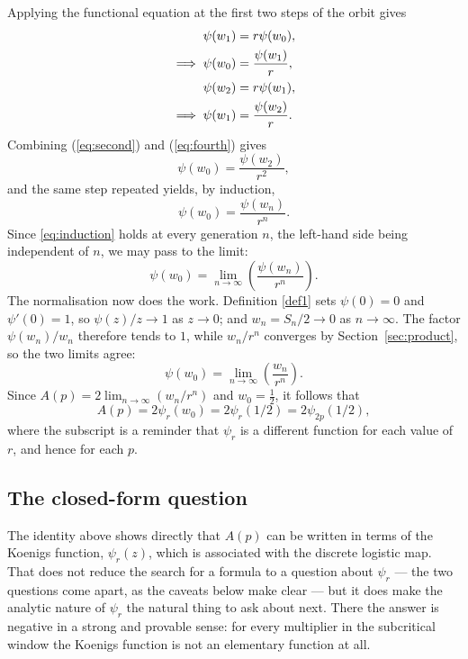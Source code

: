 \documentclass[11pt]{article}
\begin{document}
\vspace{10pt}
\noindent
Applying the functional equation at the first two steps of the orbit gives
\begin{align}
\psi(w_1) &= r\psi(w_0), \notag\\
\implies \psi(w_0) &= \frac{\psi(w_1)}{r}, \label{eq:second} \\
\psi(w_2) &= r\psi(w_1), \notag\\
\implies \psi(w_1) &= \frac{\psi(w_2)}{r}. \label{eq:fourth}
\end{align}
Combining (\ref{eq:second}) and (\ref{eq:fourth}) gives
$$\psi(w_0) = \frac{\psi(w_2)}{r^2},$$
and the same step repeated yields, by induction,
\begin{equation}
\psi(w_0) = \frac{\psi(w_n)}{r^n} .
\label{eq:induction}
\end{equation}
Since \eqref{eq:induction} holds at every generation $n$, the left-hand side being independent of $n$, we may pass to the limit:
$$\psi(w_0) = \lim_{n\to\infty}\left(\frac{\psi(w_n)}{r^n}\right).$$
The normalisation now does the work. Definition \ref{def1} sets $\psi(0)=0$ and $\psi'(0)=1$, so $\psi(z)/z\to1$ as $z\to0$; and $w_n=S_n/2\to0$ as $n\to\infty$. The factor $\psi(w_n)/w_n$ therefore tends to $1$, while $w_n/r^n$ converges by Section~\ref{sec:product}, so the two limits agree:
$$\psi(w_0) = \lim_{n\to\infty}\left(\frac{w_n}{r^n}\right).$$
Since $A(p) = 2\lim_{n\to\infty}(w_n/r^n)$ and $w_0=\tfrac12$, it follows that
\[
A(p) = 2\psi_r(w_0) = 2\psi_r(1/2) = 2\psi_{2p}(1/2),
\]
where the subscript is a reminder that $\psi_r$ is a different function for each value of $r$, and hence for each $p$.

\subsection{The closed-form question}
\label{sec:closedform}

The identity above shows directly that $A(p)$ can be written in terms of the Koenigs function, $\psi_r(z)$, which is associated with the discrete logistic map. That does not reduce the search for a formula to a question about $\psi_r$ --- the two questions come apart, as the caveats below make clear --- but it does make the analytic nature of $\psi_r$ the natural thing to ask about next. There the answer is negative in a strong and provable sense: for every multiplier in the subcritical window the Koenigs function is not an elementary function at all.
\end{document}
